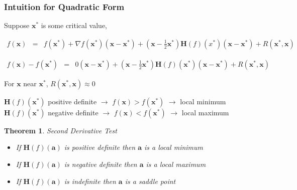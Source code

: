 \documentclass{beamer}
\newtheorem{thm}{Theorem}
\numberwithin{equation}{section}
\begin{document}
\begin{frame}
\frametitle{Intuition for Quadratic Form}

Suppose $\boldsymbol{x}^{*}$ is some critical value, 

\begin{eqnarray}
f(\boldsymbol{x}) & = & f(\boldsymbol{x}^{*} ) + \nabla f(\boldsymbol{x}^{*} ) (\boldsymbol{x} - \boldsymbol{x}^{*} ) + (\boldsymbol{x}  - \frac{1}{2}\boldsymbol{x}^{*} ) \textbf{H}(f) (x^{*} ) (\boldsymbol{x}- \boldsymbol{x}^{*})  + R(\boldsymbol{x}^{*}, \boldsymbol{x}) \nonumber 
\end{eqnarray}

\begin{eqnarray}
f(\boldsymbol{x}) - f(\boldsymbol{x}^{*} ) & = & 0 (\boldsymbol{x}- \boldsymbol{x}^{*} ) + (\boldsymbol{x}  - \frac{1}{2}\boldsymbol{x}^{*} ) \textbf{H}(f) (\boldsymbol{x}^{*} ) (\boldsymbol{x}- \boldsymbol{x}^{*})  + R(\boldsymbol{x}^{*}, \boldsymbol{x})\nonumber
\end{eqnarray}

For $\boldsymbol{x}$ near $\boldsymbol{x}^{*}$, $R(\boldsymbol{x}^{*}, \boldsymbol{x}) \approx 0$\\

\vspace{0.25in}

$\boldsymbol{H}(f)(\boldsymbol{x}^{*})$ positive definite $\rightarrow$ $f(\boldsymbol{x}) > f(\boldsymbol{x}^{*})$ $\rightarrow$ local minimum \\

$\boldsymbol{H}(f)(\boldsymbol{x}^{*})$ negative definite $\rightarrow$ $f(\boldsymbol{x}) < f(\boldsymbol{x}^{*})$ $\rightarrow$ local maximum \\


\end{frame}







\begin{frame}








\begin{thm} 
\alert{Second Derivative Test}
\begin{itemize}
\item[-] If $\boldsymbol{H}(f)(\boldsymbol{a})$ is \alert{positive definite} then $\boldsymbol{a}$ is a local minimum 
\item[-] If $\boldsymbol{H}(f)(\boldsymbol{a})$ is \alert{negative definite} then $\boldsymbol{a}$ is a local maximum 
\item[-] If $\boldsymbol{H}(f)(\boldsymbol{a})$ is \alert{indefinite} then $\boldsymbol{a}$ is a saddle point
\end{itemize}
\end{thm}



\end{frame}
\end{document}
